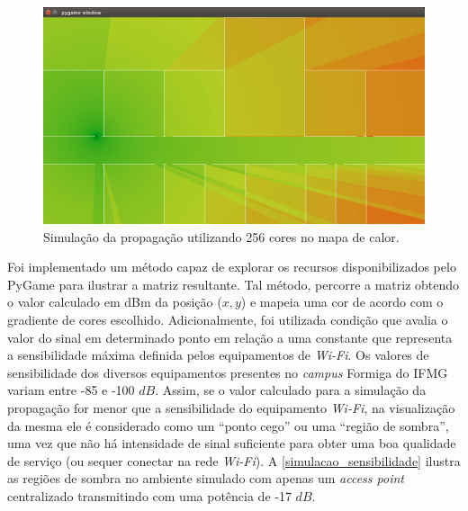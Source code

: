 \documentclass[
	12pt,				%
	twoside,			%
	a4paper,			%
	english,			%
	french,				%
	spanish,			%
	brazil				%
	]{abntex2}
\begin{document}
\begin{figure}[!ht]
    \caption{\label{represetacao_simulacao} Simulação da propagação utilizando 256 cores no mapa de calor.}
    \begin{center}
        \includegraphics[scale=0.4]{imagens/representacao-simulacao.jpg}
    \end{center}
\end{figure}

Foi implementado um método capaz de explorar os recursos
disponibilizados pelo PyGame para ilustrar a matriz resultante. Tal
método, percorre a matriz obtendo o valor calculado em dBm da posição
(\(x, y\)) e mapeia uma cor de acordo com o gradiente de cores
escolhido. Adicionalmente, foi utilizada condição que avalia o valor do
sinal em determinado ponto em relação a uma constante que representa a
sensibilidade máxima definida pelos equipamentos de \emph{Wi-Fi}. Os
valores de sensibilidade dos diversos equipamentos presentes no
\emph{campus} Formiga do IFMG variam entre -85 e -100 \(dB\). Assim, se
o valor calculado para a simulação da propagação for menor que a
sensibilidade do equipamento \emph{Wi-Fi}, na visualização da mesma ele
é considerado como um ``ponto cego'' ou uma ``região de sombra'', uma
vez que não há intensidade de sinal suficiente para obter uma boa
qualidade de serviço (ou sequer conectar na rede \emph{Wi-Fi}). A
\autoref{simulacao_sensibilidade} ilustra as regiões de sombra no
ambiente simulado com apenas um \emph{access point} centralizado
transmitindo com uma potência de -17 \(dB\).
\end{document}
